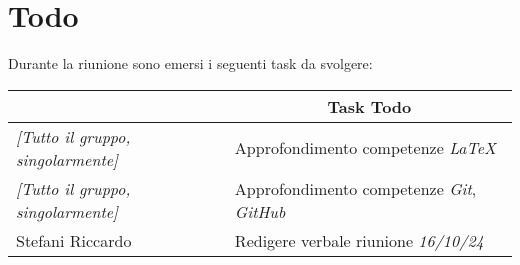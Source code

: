 \section{Todo}

Durante la riunione sono emersi i seguenti task da svolgere:

\vspace{0.5cm}

\begin{table}[htbp]
\begin{tabular}{|p{}|p{}|}
    \hline
    \rowcolor[gray]{0.9}
    \multicolumn{1}{|c|}{\textbf{Assegnatario}} & \multicolumn{1}{|c|}{\textbf{Task Todo}} \\
    \hline
    \emph{[Tutto il gruppo, singolarmente]} & Approfondimento competenze \emph{LaTeX} \\
    \hline
    \emph{[Tutto il gruppo, singolarmente]} & Approfondimento competenze \emph{Git}, \emph{GitHub} \\
    \hline
    Stefani Riccardo & Redigere verbale riunione \emph{16/10/24} \\
    \hline
\end{tabular}
\end{table}
